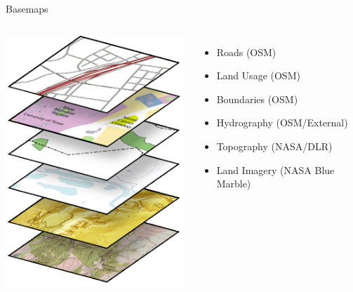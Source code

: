 \documentclass{beamer}
\begin{document}
\begin{frame}{Basemaps}
 \begin{columns}
   \includegraphics[scale=0.5]{images/basemap_layers}
   \begin{itemize}
    \item Roads (OSM)
    \item Land Usage (OSM)
    \item Boundaries (OSM)
    \item Hydrography (OSM/External)
    \item Topography (NASA/DLR)
    \item Land Imagery (NASA Blue Marble)
   \end{itemize}
 \end{columns}
\end{frame}
\end{document}
